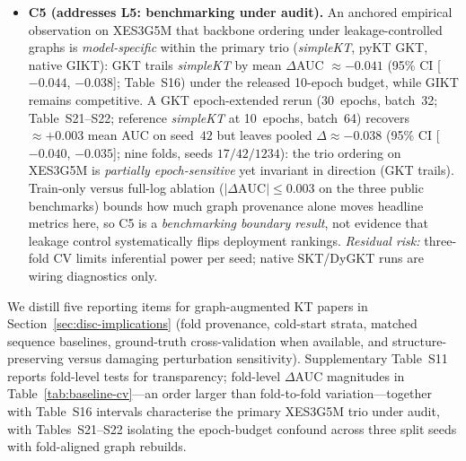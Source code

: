 \documentclass[pdflatex,sn-mathphys-num]{sn-jnl}
\newcommand{\GKTdeltaci}{[$-0.044$, $-0.038$]}
\newcommand{\GKTthirtydeltavec}{-0.038}
\newcommand{\GKTthirtydeltaci}{[$-0.040$, $-0.035$]}
\newcommand{\GKTepochgain}{+0.003}
\begin{document}
\begin{itemize}
  \emph{Residual risk:} GT cross-validation is Junyi-only at a single
  expert threshold ($\theta{=}0.5$).
  \item \textbf{C5 (addresses L5: benchmarking under audit).} An anchored
  empirical observation on XES3G5M that backbone ordering under
  leakage-controlled graphs is \emph{model-specific} within the primary trio
  (\textit{simpleKT}, pyKT GKT, native GIKT): GKT trails \textit{simpleKT} by
  mean $\Delta$AUC ${\approx}{-}0.041$ (95\% CI \GKTdeltaci{}; Table~S16) under
  the released 10-epoch budget, while GIKT remains competitive. A
  GKT epoch-extended rerun (30~epochs, batch~32; Table~S21--S22; reference
  \textit{simpleKT} at 10~epochs, batch~64) recovers
  ${\approx}\GKTepochgain{}$ mean AUC on seed~$42$ but leaves pooled
  $\Delta{\approx}\GKTthirtydeltavec{}$ (95\% CI \GKTthirtydeltaci{};
  nine folds, seeds $17/42/1234$): the trio ordering on XES3G5M is
  \emph{partially epoch-sensitive} yet invariant in direction (GKT trails).
  Train-only versus full-log
  ablation ($|\Delta\text{AUC}|{\leq}0.003$ on the three public benchmarks)
  bounds how much graph provenance alone moves headline metrics here, so C5 is
  a \emph{benchmarking boundary result}, not evidence that leakage control
  systematically flips deployment rankings.
  \emph{Residual risk:} three-fold CV limits inferential power per seed; native
  SKT/DyGKT runs are wiring diagnostics only.
\end{itemize}

We distill five reporting items for graph-augmented KT papers in
Section~\ref{sec:disc-implications} (fold provenance, cold-start strata,
matched sequence baselines, ground-truth cross-validation when available, and
structure-preserving versus damaging perturbation sensitivity).
Supplementary Table~S11 reports fold-level tests for transparency; fold-level
$\Delta$AUC magnitudes in Table~\ref{tab:baseline-cv}---an order larger than
fold-to-fold variation---together with Table~S16 intervals characterise the
primary XES3G5M trio under audit, with Tables~S21--S22 isolating the epoch-budget
confound across three split seeds with fold-aligned graph rebuilds.
\end{document}
